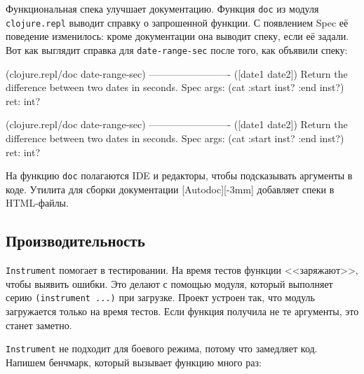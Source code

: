 
Функциональная спека улучшает документацию. Функция \verb|doc| из модуля
\verb|clojure.repl| выводит справку о запрошенной функции. С появлением Spec
её поведение изменилось: кроме документации она выводит спеку, если её
задали. Вот как выглядит справка для \verb|date-range-sec| после того, как
объявили спеку:

\ifx\devicetype\mobile

\begin{english}
  \begin{clojure}
(clojure.repl/doc date-range-sec)
-------------------------
([date1 date2])
  Return the difference
            between two dates in seconds.
Spec
  args: (cat :start inst? :end inst?)
  ret: int?
  \end{clojure}
\end{english}

\else

\begin{english}
  \begin{clojure}
(clojure.repl/doc date-range-sec)
-------------------------
([date1 date2])
  Return the difference between two dates in seconds.
Spec
  args: (cat :start inst? :end inst?)
  ret: int?
  \end{clojure}
\end{english}

\fi


На функцию \verb|doc| полагаются IDE и редакторы, чтобы подсказывать аргументы
в коде. Утилита для сборки документации [Autodoc][-3mm]
добавляет спеки в HTML-файлы.

\subsection{Производительность}


\verb|Instrument| помогает в тестировании. На время тестов функции
<<заряжают>>, чтобы выявить ошибки. Это делают с помощью модуля, который
выполняет серию \verb|(instrument ...)| при загрузке. Проект устроен так, что
модуль загружается только на время тестов. Если функция получила не те
аргументы, это станет заметно.


\verb|Instrument| не подходит для боевого режима, потому что замедляет
код. Напишем бенчмарк, который вызывает функцию много раз:

